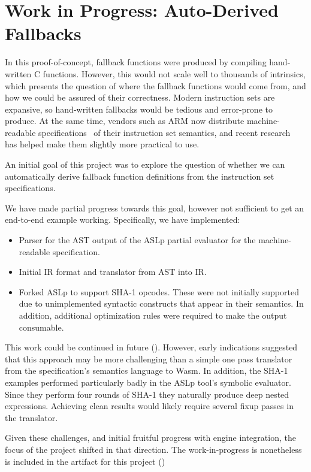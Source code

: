 \section{Work in Progress: Auto-Derived Fallbacks}
\label{sec:wip}

In this proof-of-concept, fallback functions were produced by compiling
hand-written C functions.  However, this would not scale well to thousands of
intrinsics, which presents the question of where the fallback functions would
come from, and how we could be assured of their correctness. Modern instruction
sets are expansive, so hand-written fallbacks would be tedious and error-prone
to produce. At the same time, vendors such as ARM now distribute
machine-readable specifications~\cite{arm-machine-readable-spec} of their
instruction set semantics, and recent research~\cite{aslp} has helped make them
slightly more practical to use.

An initial goal of this project was to explore the question of whether we can
automatically derive fallback function definitions from the instruction set
specifications.

We have made partial progress towards this goal, however not sufficient to get
an end-to-end example working.  Specifically, we have implemented:

\begin{itemize}
    \item Parser for the AST output of the ASLp partial evaluator for the
    machine-readable specification.
    \item Initial IR format and translator from AST into IR.
    \item Forked ASLp to support SHA-1 opcodes. These were not initially
    supported due to unimplemented syntactic constructs that appear in their
    semantics. In addition, additional optimization rules were required to make
    the output consumable.
\end{itemize}

This work could be continued in future (). However, early
indications suggested that this approach may be more challenging than a simple
one pass translator from the specification's semantics language to Wasm.  In
addition, the SHA-1 examples performed particularly badly in the ASLp tool's
symbolic evaluator. Since they perform four rounds of SHA-1 they naturally
produce deep nested expressions.  Achieving clean results would likely require
several fixup passes in the translator.

Given these challenges, and initial fruitful progress with engine integration,
the focus of the project shifted in that direction.  The work-in-progress is
nonetheless is included in the artifact for this project ()
